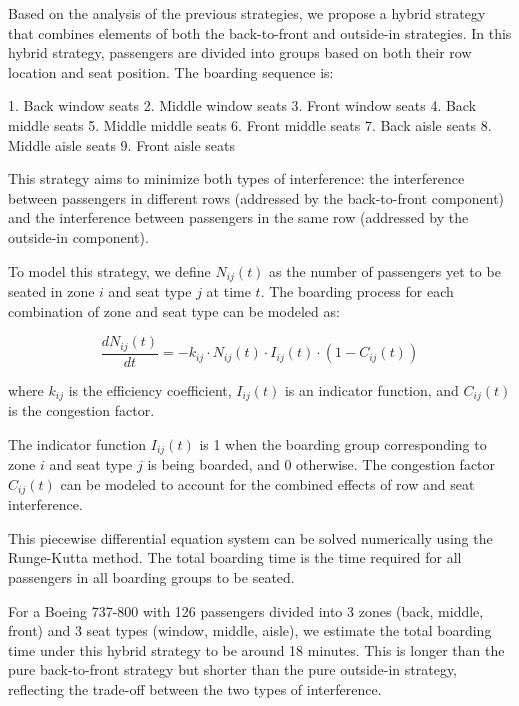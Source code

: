 \documentclass[12pt,a4paper]{article}
\begin{document}
Based on the analysis of the previous strategies, we propose a hybrid strategy that combines elements of both the back-to-front and outside-in strategies. In this hybrid strategy, passengers are divided into groups based on both their row location and seat position. The boarding sequence is:

1. Back window seats
2. Middle window seats
3. Front window seats
4. Back middle seats
5. Middle middle seats
6. Front middle seats
7. Back aisle seats
8. Middle aisle seats
9. Front aisle seats

This strategy aims to minimize both types of interference: the interference between passengers in different rows (addressed by the back-to-front component) and the interference between passengers in the same row (addressed by the outside-in component).

To model this strategy, we define $N_{ij}(t)$ as the number of passengers yet to be seated in zone $i$ and seat type $j$ at time $t$. The boarding process for each combination of zone and seat type can be modeled as:

\begin{equation}
\frac{dN_{ij}(t)}{dt} = -k_{ij} \cdot N_{ij}(t) \cdot I_{ij}(t) \cdot (1 - C_{ij}(t))
\label{eq:hybrid_boarding}
\end{equation}

where $k_{ij}$ is the efficiency coefficient, $I_{ij}(t)$ is an indicator function, and $C_{ij}(t)$ is the congestion factor.

The indicator function $I_{ij}(t)$ is 1 when the boarding group corresponding to zone $i$ and seat type $j$ is being boarded, and 0 otherwise. The congestion factor $C_{ij}(t)$ can be modeled to account for the combined effects of row and seat interference.

This piecewise differential equation system can be solved numerically using the Runge-Kutta method. The total boarding time is the time required for all passengers in all boarding groups to be seated.

For a Boeing 737-800 with 126 passengers divided into 3 zones (back, middle, front) and 3 seat types (window, middle, aisle), we estimate the total boarding time under this hybrid strategy to be around 18 minutes. This is longer than the pure back-to-front strategy but shorter than the pure outside-in strategy, reflecting the trade-off between the two types of interference.
\end{document}
